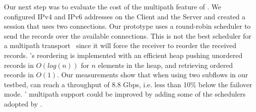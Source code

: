 

Our next step was to evaluate the cost of the multipath feature of \tcpls.
We configured IPv4 and IPv6 addresses on the Client and the Server and created
a \tcpls session that uses two \tcp connections. Our \tcpls prototype uses a
round-robin scheduler to send the records over the available connections. This
is not the best scheduler for a multipath
transport~\cite{paasch2014experimental} since it will force the
receiver to reorder the received records. \tcpls’s reordering is implemented
with an efficient heap pushing unordered records in $O(log(n))$
for $n$ elements in the heap, and retrieving ordered records
in $O(1)$. Our measurements show that when using two subflows in our testbed,
\tcpls can reach a throughput of 8.8 Gbps, i.e. less than 10\% below the
failover mode. \tcpls' multipath support could be improved by adding some
of the schedulers adopted by \mptcp. 



